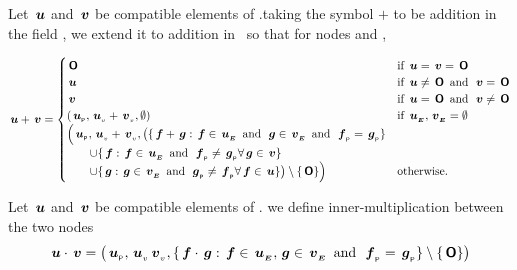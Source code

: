 
\begin{definition}\label{deftree+}
  Let $\node{u}$ and $\node{v}$ be compatible elements of \TDOM.\@Then taking the
  symbol $+$ to be addition in the field \TFIELD, we extend  it to addition in
  \TDOM\ so that for nodes  and ,

  \begin{align}
    \node{u}+\node{v}=\begin{cases}
    \nulltree & \text {if } \node{u} = \node{v} = \nulltree \\
    \node{u} & \text {if } \node{u} \neq \nulltree \mand  \node{v} = \nulltree \\
    \node{v} & \text {if } \node{u} = \nulltree \mand \node{v} \neq \nulltree  \\
    (\nlabel{u}, \nv{u} + \nv{v}, \emptyset) & \text{if } \extn{u}, \extn{v} = \emptyset \\
    \Bigl(\nlabel{u}, \nv{u} + \nv{v}, \bigl(\{\node{f}+\node{g}:\node{f}\in\extn{u}\mand\node{g}\in\extn{v}\mand\nlabel{f}=\nlabel{g}\} & \\
    \qquad\cup\{\node{f}:\node{f}\in\extn{u}\mand\nlabel{f}\neq\nlabel{g}\forall\node{g}\in\node{v}\} & \\
    \qquad\cup\{\node{g}:\node{g}\in\extn{v}\mand\nlabel{g}\neq\nlabel{f}\forall\node{f}\in\node{u}\}\bigr)\setminus\{\nulltree\}\Bigr)  & \text{otherwise.}
    \end{cases}
  \end{align}
\end{definition}


\begin{definition}\label{deftree*}
  Let $\node{u}$ and $\node{v}$ be compatible elements of \TDOM.\@Then 
  we define inner-multiplication between the two nodes
  \begin{equation}
    \node{u}\cdot\node{v} = \bigl(\nlabel{u}, \nv{u} \nv{v}, \{\node{f}\cdot\node{g}: \node{f} \in \extn{u},\node{g} \in \extn{v} \mand \nlabel{f} = \nlabel{g}\}\setminus\{\nulltree\}\bigr)
  \end{equation} 
\end{definition}



